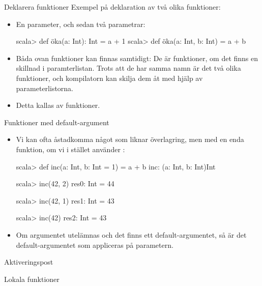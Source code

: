 




\begin{Slide}{Deklarera funktioner}
Exempel på deklaration av två olika funktioner:
\begin{itemize}
\item En parameter, och sedan två parametrar:
\begin{REPLnonum}
scala> def öka(a: Int): Int = a + 1
scala> def öka(a: Int, b: Int) = a + b
\end{REPLnonum}
\item Båda ovan funktioner kan finnas samtidigt: De är  funktioner, om det finns en skillnad i paramterlistan. Trots att de har samma namn är det två olika funktioner, och kompilatorn kan skilja dem åt med hjälp av parameterlistorna.

\item Detta kallas   av funktioner.
\end{itemize}
\end{Slide} 


\begin{Slide}{Funktioner med default-argument}\SlideFontSmall

\begin{itemize}
\item Vi kan ofta åstadkomma något som liknar överlagring, men med en enda funktion, om vi i stället använder :
\begin{REPLnonum}
scala> def inc(a: Int, b: Int = 1) = a + b
inc: (a: Int, b: Int)Int

scala> inc(42, 2)
res0: Int = 44

scala> inc(42, 1)
res1: Int = 43

scala> inc(42)
res2: Int = 43

\end{REPLnonum}
\item Om argumentet utelämnas och det finns ett default-argumentet, så är det default-argumentet som appliceras på parametern.
\end{itemize}
\end{Slide} 


\begin{Slide}{Aktiveringspost}
\end{Slide} 


\begin{Slide}{Lokala funktioner}
\end{Slide} 




